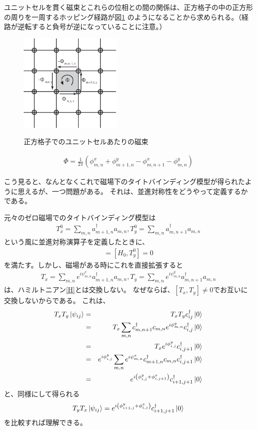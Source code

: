 \documentclass{article}
\begin{document}
ユニットセルを貫く磁束とこれらの位相との間の関係は、正方格子の中の正方形の周りを一周するホッピング経路が図\ref{sq}
のようになることから求められる。（経路が逆転すると負号が逆になっていることに注意。）

\begin{figure}[hbtp]
\centering
\includegraphics[width=5cm]{square-lattice.eps}
\label{sq}
\caption{正方格子でのユニットセルあたりの磁束}
\end{figure}

\begin{eqnarray}
\Phi=\frac{1}{2\pi}\left(\phi_{m,n}^x+\phi_{m+1,n}^y-\phi_{m,n+1}^x-\phi_{m,n}^y
\right)
\end{eqnarray}

こう見ると、なんとなくこれで磁場下のタイトバインディング模型が得られたように思えるが、一つ問題がある。
それは、並進対称性をどうやって定義するかである。

元々のゼロ磁場でのタイトバインディング模型は
\begin{eqnarray}
T_x^0=\sum_{m,n}a_{m+1,n}^\dagger
a_{m,n}, T_y^0=\sum_{m,n}a_{m,n+1}^\dagger
a_{m,n} 
\end{eqnarray}
という風に並進対称演算子を定義したときに、
\begin{eqnarray}
[H_0,T_x^0]=[H_0,T_y^0]=0
\end{eqnarray}
を満たす。しかし、磁場がある時にこれを直接拡張すると
\begin{eqnarray}
T_x=\sum_{m,n} e^{i\psi_{m,n}^x}a_{m+1,n}^\dagger
a_{m,n}, T_y=\sum_{m,n}e^{i\psi_{m,n}^y}a_{m,n+1}^\dagger
a_{m,n} 
\end{eqnarray}
は、ハミルトニアン\ref{H}とは交換しない。
なぜならば、$[T_x, T_y] \neq 0$でお互いに交換しないからである。
これは、
\begin{eqnarray}
T_x T_y \Ket{\psi_{ij}}&=&T_x T_y c_{ij}^\dagger \Ket{0} \nonumber \\
&=& T_x \sum_{m,n} c_{m,n+1}^\dagger c_{m,n} e^{i\phi_{m,n}^y}c_{i,j}^\dagger
\Ket{0} \nonumber \\
&=& T_x e^{i\phi_{i,j}^y} c_{i,j+1}^\dagger \Ket{0} \nonumber \\
&=& e^{i\phi_{i,j}^y} \sum_{m,n}e^{i\psi_{m,n}^x} c_{m+1,n}^\dagger c_{m,n}
c_{i,j+1}^\dagger \Ket{0} \nonumber \\
&=& e^{i \left( \phi_{i,j}^y+ \phi_{i, j+1}^x\right)}  c_{i+1,j+1}^\dagger
\Ket{0}
\end{eqnarray}
と、同様にして得られる
\begin{eqnarray}
T_y T_x \Ket{\psi_{ij}}
= e^{i \left( \phi_{i+1,j}^y+ \phi_{i, j}^x\right)}  c_{i+1,j+1}^\dagger
\Ket{0}
\end{eqnarray}
を比較すれば理解できる。
\end{document}

